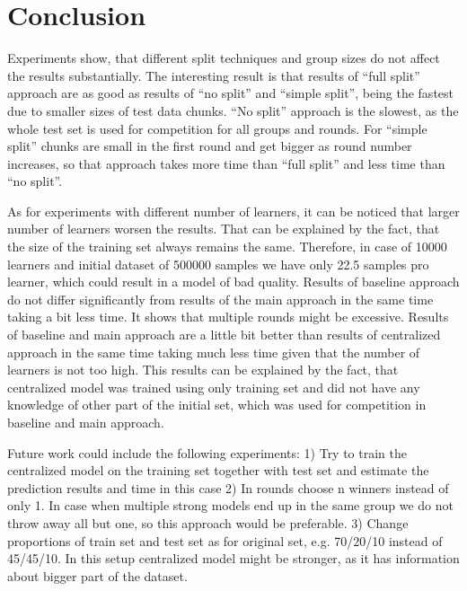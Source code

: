 \documentclass{scrartcl}
\begin{document}
\section{Conclusion}
Experiments show, that different split techniques and group sizes do not affect the results substantially. The interesting result is that results of “full split” approach are as good as results of “no split” and “simple split”, being the fastest due to smaller sizes of test data chunks. “No split” approach is the slowest, as the whole test set is used for competition for all groups and rounds. For “simple split” chunks are small in the first round and get bigger as round number increases, so that approach takes more time than “full split” and less time than “no split”.

As for experiments with different number of learners, it can be noticed that larger number of learners worsen the results. That can be explained by the fact, that the size of the training set always remains the same. Therefore, in case of 10000 learners and initial dataset of 500000 samples we have only 22.5 samples pro learner, which could result in a model of bad quality.
Results of baseline approach do not differ significantly from results of the main approach in the same time taking a bit less time. It shows that multiple rounds might be excessive.  
Results of baseline and main approach are a little bit better than results of centralized approach in the same time taking much less time given that the number of learners is not too high. This results can be explained by the fact, that centralized model was trained using only training set and did not have any knowledge of other part of the initial set, which was used for competition in baseline and main approach.

Future work could include the following experiments:
1)	Try to train the centralized model on the training set together with test set and estimate the prediction results and time in this case
2)	In rounds choose n winners instead of only 1. In case when multiple strong models end up in the same group we do not throw away all but one, so this approach would be preferable. 
3)	Change proportions of train set and test set as for original set, e.g. 70/20/10 instead of 45/45/10. In this setup centralized model might be stronger, as it has information about bigger part of the dataset.



\end{document}
